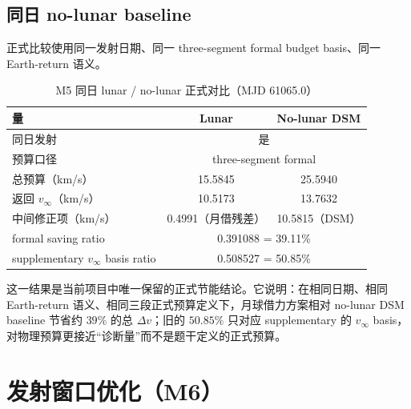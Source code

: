 \documentclass[12pt,a4paper]{ctexart}
\begin{document}
\subsection{同日 no-lunar baseline}
正式比较使用同一发射日期、同一 three-segment formal budget basis、同一 Earth-return 语义。
\begin{table}[H]
\centering
\caption{M5 同日 lunar / no-lunar 正式对比（MJD 61065.0）}
\begin{tabular}{lcc}
\toprule
量 & Lunar & No-lunar DSM \\
\midrule
同日发射 & \multicolumn{2}{c}{是} \\
预算口径 & \multicolumn{2}{c}{three-segment formal} \\
总预算（km/s） & 15.5845 & 25.5940 \\
返回 $v_{\infty}$（km/s） & 10.5173 & 13.7632 \\
中间修正项（km/s） & 0.4991（月借残差） & 10.5815（DSM） \\
formal saving ratio & \multicolumn{2}{c}{0.391088 = 39.11\%} \\
supplementary $v_{\infty}$ basis ratio & \multicolumn{2}{c}{0.508527 = 50.85\%} \\
\bottomrule
\end{tabular}
\end{table}

这一结果是当前项目中唯一保留的正式节能结论。它说明：在相同日期、相同 Earth-return 语义、相同三段正式预算定义下，月球借力方案相对 no-lunar DSM baseline 节省约 $39\%$ 的总 $\Delta v$；旧的 $50.85\%$ 只对应 supplementary 的 $v_{\infty}$ basis，对物理预算更接近“诊断量”而不是题干定义的正式预算。

\section{发射窗口优化（M6）}
\end{document}
